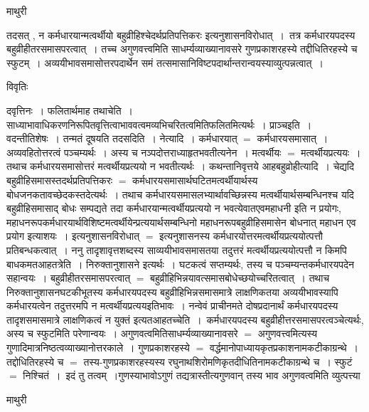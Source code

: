 \documentclass[10pt, openany]{book}
\begin{document}
{\newpage
\begin{center}  माथुरी  \end{center}
{\la 
तदसत् , न कर्मधारयान्मत्वर्थीयो बहुव्रीहिश्चेदर्थप्रतिपत्तिकरः इत्यनुशासनविरोधात्~।~तत्र कर्मधारयपदस्य बहुव्रीहीतरसमासपरत्वात्~। तच्च अगुणवत्त्वमिति साधर्म्यव्याख्यानावसरे गुणप्रकाशरहस्ये तद्दीधितिरहस्ये च स्फुटम्~। अव्ययीभावसमासोत्तरपदार्थेन समं तत्समासानिविष्टपदार्थान्तरान्वयस्याव्युत्पन्नत्वात्~।}
\begin{center}     विवृतिः \end{center}
दवृत्तिनः~। फलितार्थमाह तथाचेति~। साध्याभावाधिकरणनिरूपितवृत्तित्वाभाववत्वमव्यभिचरितत्वमितिफलितमित्यर्थः~। प्राञ्चइति~। वदन्तीतिशेषः~। तन्मतं
दूषयति तदसदिति~। नेत्यादि~। कर्मधारयात् $=$ कर्मधारयसमासात्~। अव्यवहितोत्तरत्वं पञ्चम्यर्थः~। अस्य च नञ्पदोत्तराध्याहृतभवतीत्यनेन~। मत्वर्थीयः $=$ मत्वर्थीयप्रत्ययः~। तथाच कर्मधारयसमासोत्तरं मत्वर्थीयप्रत्ययो न भवतीत्यर्थः~। कथन्तानिवृत्तये आह\textendash  बहुव्रोहीत्यादि~। चेद्यदि बहुव्रीहिसमासस्तदर्थप्रतिपत्तिकरः $=$ कर्मधारयसमासार्थघटितमत्वर्थीयार्थस्य बोधजनकतावच्छेदकस्तदेत्यर्थः~। तथाच कर्मधारयसमासलभ्यार्थावच्छिन्नस्य मत्वर्थीयार्थसम्बन्धिनश्च यदि बहुव्रीहिसमासाद् बोधः सम्पद्यते तदा कर्मधारयान्मत्वर्थीयप्रत्ययो न भवत्येवातएवमहाधनी इति न प्रयोगः,
महाधनरूपकर्मधारयार्थविशिष्टमत्वर्थीयेन्प्रत्ययार्थसम्बन्धिनो महाधनरूपबहुव्रीहिसमासेन बोधनात् महाधन एव प्रयोग इत्याशयः~। इत्यनुशासनविरोधात् $=$ इत्यनुशासनस्य कर्मधारयोत्तरमत्वर्थीयप्रत्ययोत्पत्तौ प्रतिबन्धकत्वात्~। ननु तादृशावृत्तशब्दस्य साव्ययीभावसमासतया तदुत्तरं मत्वर्थीयप्रत्ययोत्पत्तौ न किमपि बाधकमतआह\textendash तत्रेति~। निरुक्तानुशासने इत्यर्थः~। घटकत्वं सप्तम्यर्थः,  तस्य च पञ्चम्यन्तकर्मधारयपदेन सहान्वयः~। बहुव्रीहीतरसमासपरत्वात् $=$ बहुव्रीहिभिन्नयावत्समासबोधेच्छयोच्चरितत्वात्~। तथाच निरुक्तानुशासनघटकीभूतस्य कर्मधारयपदस्य बहुव्रीहिभिन्नसमासमात्रे लाक्षणिकतया अव्ययीभावस्यापि कर्मधारयत्वेन तदुत्तरमपि न मत्वर्थीयप्रत्ययइतिभावः~। नन्वेवं प्राचीनमते दोषप्रदानार्थं कर्मधारयपदस्य तादृशसमासमात्रे लाक्षणिकत्वं न युक्तं इत्यतआह\textendash  तच्चेति~।~कर्मधारयपदस्य बहुव्रीहीत्तरसमासपरत्वञ्चेत्यर्थः, अस्य च स्फुटमिति परेणान्वयः~। अगुणवत्वमितिसाधर्म्यव्याख्यानावसरे $=$ अगुणवत्त्वमित्यस्य गुणादिमात्रनिष्ठत्वव्याख्यानोत्तरकाले~। गुणप्रकाशरहस्ये $=$ वर्द्धमानोपाध्यायकृतप्रकाशनामकटीकाग्रन्थे~। तद्दोधितिरहस्ये च $=$ तस्य-गुणप्रकाशरहस्यस्य
रघुनाथशिरोमणिकृतदीधितिनामकटीकाग्रन्थे च~। स्फुटं $=$ निश्चितं~।~इदं तु तत्वम्~।गुणस्याभावोऽगुणं तद्यत्रास्तीत्यगुणवान् तस्य भाव अगुणवत्वमिति व्युत्पत्त्या
\newpage
\begin{center}  माथुरी  \end{center}
}
\end{document}
